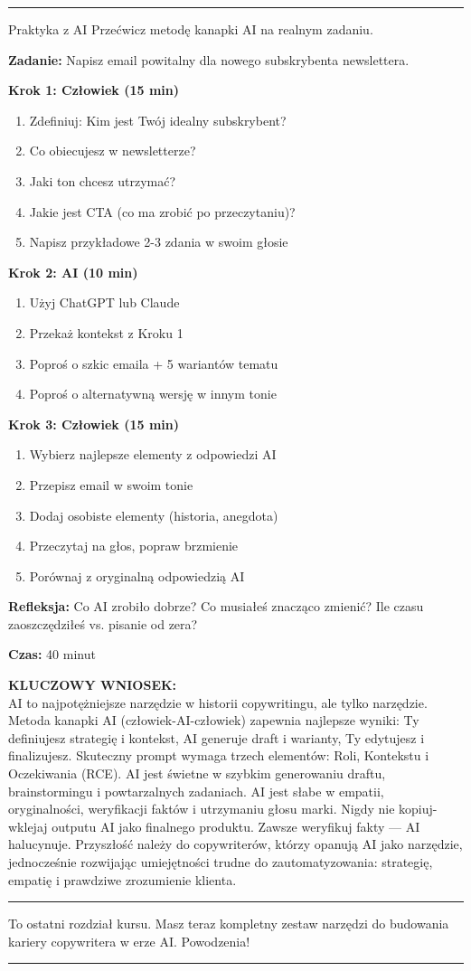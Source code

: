 \documentclass[
  12pt,
  a4paper,
  twoside,
  openright,
  12pt,
  DIV=12,
  BCOR=12mm]{scrbook}
\newcommand{\decoline}{%
  \begin{center}
    \textcolor{bordergray}{\rule{0.3\textwidth}{0.5pt}}
  \end{center}
}
\newcommand{\takeaway}[1]{%
  \begin{tcolorbox}[
    enhanced,
    colback=accentgreen!10,
    colframe=accentgreen,
    boxrule=0pt,
    borderline south={3pt}{0pt}{accentgreen},
    sharp corners,
    left=15pt, right=15pt, top=10pt, bottom=10pt
  ]
    \textbf{\color{accentgreen}KLUCZOWY WNIOSEK:}\\[5pt]
    #1
  \end{tcolorbox}
}
\begin{document}
\decoline

\begin{cwiczenie}{Praktyka z AI}
Przećwicz metodę kanapki AI na realnym zadaniu.

\textbf{Zadanie:} Napisz email powitalny dla nowego subskrybenta newslettera.

\textbf{Krok 1: Człowiek (15 min)}
\begin{enumerate}
  \item Zdefiniuj: Kim jest Twój idealny subskrybent?
  \item Co obiecujesz w newsletterze?
  \item Jaki ton chcesz utrzymać?
  \item Jakie jest CTA (co ma zrobić po przeczytaniu)?
  \item Napisz przykładowe 2-3 zdania w swoim głosie
\end{enumerate}

\textbf{Krok 2: AI (10 min)}
\begin{enumerate}
  \item Użyj ChatGPT lub Claude
  \item Przekaż kontekst z Kroku 1
  \item Poproś o szkic emaila + 5 wariantów tematu
  \item Poproś o alternatywną wersję w innym tonie
\end{enumerate}

\textbf{Krok 3: Człowiek (15 min)}
\begin{enumerate}
  \item Wybierz najlepsze elementy z odpowiedzi AI
  \item Przepisz email w swoim tonie
  \item Dodaj osobiste elementy (historia, anegdota)
  \item Przeczytaj na głos, popraw brzmienie
  \item Porównaj z oryginalną odpowiedzią AI
\end{enumerate}

\textbf{Refleksja:} Co AI zrobiło dobrze? Co musiałeś znacząco zmienić? Ile czasu zaoszczędziłeś vs. pisanie od zera?

\textbf{Czas:} 40 minut
\end{cwiczenie}

\takeaway{AI to najpotężniejsze narzędzie w historii copywritingu, ale tylko narzędzie. Metoda kanapki AI (człowiek-AI-człowiek) zapewnia najlepsze wyniki: Ty definiujesz strategię i kontekst, AI generuje draft i warianty, Ty edytujesz i finalizujesz. Skuteczny prompt wymaga trzech elementów: Roli, Kontekstu i Oczekiwania (RCE). AI jest świetne w szybkim generowaniu draftu, brainstormingu i powtarzalnych zadaniach. AI jest słabe w empatii, oryginalności, weryfikacji faktów i utrzymaniu głosu marki. Nigdy nie kopiuj-wklejaj outputu AI jako finalnego produktu. Zawsze weryfikuj fakty --- AI halucynuje. Przyszłość należy do copywriterów, którzy opanują AI jako narzędzie, jednocześnie rozwijając umiejętności trudne do zautomatyzowania: strategię, empatię i prawdziwe zrozumienie klienta.}

\begin{center}\rule{0.5\linewidth}{0.5pt}\end{center}

To ostatni rozdział kursu. Masz teraz kompletny zestaw narzędzi do
budowania kariery copywritera w erze AI. Powodzenia!

\decoline


\backmatter
\end{document}

